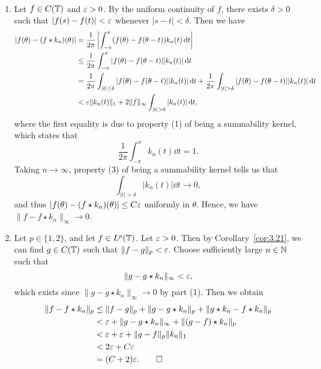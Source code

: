 \begin{pf}~
    \begin{enumerate}[(1)]
        \item Let $f \in C(\mathbb{T})$ and $\varepsilon > 0$. By the uniform continuity of $f$, there exists 
        $\delta > 0$ such that $|f(s) - f(t)| < \varepsilon$ whenever $|s - t| < \delta$. Then we have 
        \begin{align*}
            |f(\theta) - (f \star k_n)(\theta)| 
            &= \frac{1}{2\pi} \left| \int_{-\pi}^\pi (f(\theta) - f(\theta - t)) k_n(t)\dd t \right| \\ 
            &\leq \frac{1}{2\pi} \int_{-\pi}^\pi |f(\theta) - f(\theta - t)| |k_n(t)|\dd t \\ 
            &= \frac{1}{2\pi} \int_{|t|\leq\delta} |f(\theta) - f(\theta - t)||k_n(t)|\dd t 
            + \frac{1}{2\pi} \int_{|t|>\delta} |f(\theta) - f(\theta - t)||k_n(t)|\dd t \\ 
            &< \eps\|k_n(t)\|_1 + 2\|f\|_\infty \int_{|t|>\delta} |k_n(t)|\dd t, 
        \end{align*}
        where the first equality is due to property (1) of being a summability kernel, which 
        states that 
        \[ \frac{1}{2\pi} \int_{-\pi}^\pi k_n(t)\dd t = 1. \] 
        Taking $n \to \infty$, property (3) of being a summability kernel tells us that 
        \[ \int_{|t|>\delta} |k_n(t)|\dd t \to 0, \] 
        and thus $|f(\theta) - (f \star k_n)(\theta)| \leq C\varepsilon$ uniformly in $\theta$. 
        Hence, we have $\|f - f \star k_n\|_\infty \to 0$. 

        \item Let $p \in \{1, 2\}$, and let $f \in L^p(\mathbb{T})$. Let $\varepsilon > 0$. Then by 
        Corollary~\ref{cor:3.21}, we can find $g \in C(\mathbb{T})$ such that $\|f - g\|_p < \varepsilon$. 
        Choose sufficiently large $n \in \mathbb{N}$ such that 
        \[ \|g - g \star k_n\|_\infty < \varepsilon, \] 
        which exists since $\|g - g \star k_n\|_\infty \to 0$ by part (1). Then we obtain 
        \begin{align*}
            \|f - f \star k_n\|_p 
            &\leq \|f - g\|_p + \|g - g \star k_n\|_p + \|g \star k_n - f \star k_n\|_p \\ 
            &< \varepsilon + \|g - g \star k_n\|_\infty + \|(g - f) \star k_n\|_p \\ 
            &< \varepsilon + \varepsilon + \|g - f\|_p \|k_n\|_1 \\ 
            &< 2\varepsilon + C\varepsilon \\ 
            &= (C + 2)\varepsilon. \qedhere 
        \end{align*}
    \end{enumerate}
\end{pf}

